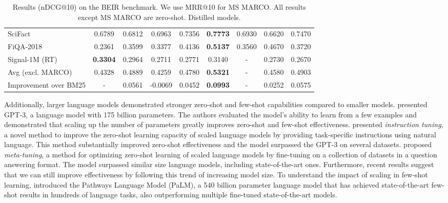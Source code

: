 \documentclass[sigconf,nonacm]{acmart}
\begin{document}
\begin{table*}[]
\begin{tabular}{lc|cccc|ccc}
SciFact & 0.6789 & 0.6812 
& 0.6963 & 0.7356 & \textbf{0.7773} & 0.6930 & 0.6620 & 0.7470 \\
FiQA-2018 & 0.2361 & 0.3599 
& 0.3377 & 0.4136 & \textbf{0.5137} & 0.3560 & 0.4670 & 0.3720  \\
Signal-1M (RT) & \textbf{0.3304} & 0.2964 & 0.2711 & 0.2771 & 0.3140 & - & 0.2730 & 0.2670 \\
\midrule
Avg (excl. MARCO) & 0.4328 & 0.4889 & 0.4259 & 0.4780 & \textbf{0.5321} & - & 0.4580 & 0.4903  \\
Improvement over BM25 & - & 0.0561 & -0.0069 & 0.0452 & \textbf{0.0993} & - & 0.0252 & 0.0575  \\
\bottomrule
\end{tabular}
\caption{Results (nDCG@10) on the BEIR benchmark. We use MRR@10 for MS MARCO. All results except MS MARCO are zero-shot. Distilled models.}
\label{tab:main_results}
\end{table*}

Additionally, larger language models demonstrated stronger zero-shot and few-shot capabilities compared to smaller models. \citet{NEURIPS2020_1457c0d6} presented GPT-3, a language model with 175 billion parameters. The authors evaluated the model's ability to learn from a few examples and demonstrated that scaling up the number of parameters greatly improves zero-shot and few-shot effectiveness. \citet{wei2022finetuned} presented \textit{instruction tuning}, a novel method to improve the zero-shot learning capacity of scaled language models by providing task-specific instructions using natural language. This method substantially improved zero-shot effectiveness and the model surpassed the GPT-3 on several datasets. \citet{metalmm} proposed \textit{meta-tuning}, a method for optimizing zero-shot learning of scaled language models by fine-tuning on a collection of datasets in a question answering format. The model surpassed similar size language models, including state-of-the-art ones. Furthermore, recent results suggest that we can still improve effectiveness by following this trend of increasing model size. To understand the impact of scaling in few-shot learning, \citet{PALM} introduced the Pathways Language Model (PaLM), a 540 billion parameter language model that has achieved state-of-the-art few-shot results in hundreds of language tasks, also outperforming multiple fine-tuned state-of-the-art models.
\end{document}
